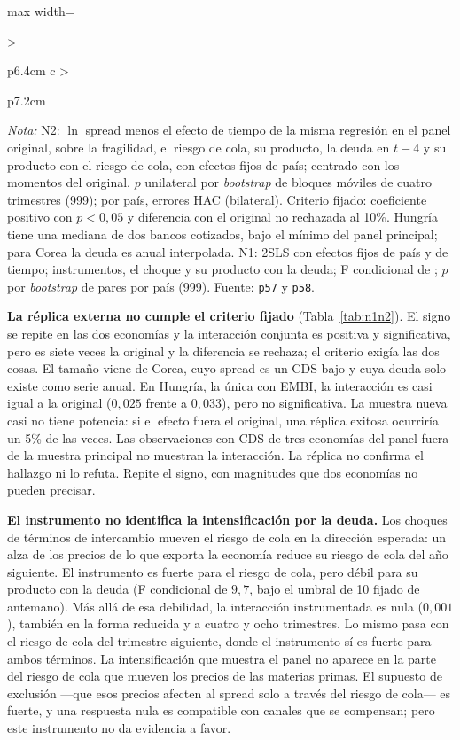 \begin{table}[htbp]
\begin{adjustbox}{max width=\linewidth}
\begin{tabular}{>{\raggedright\arraybackslash}p{6.4cm} c >{\raggedright\arraybackslash}p{7.2cm}}
\bottomrule
\end{tabular}
\end{adjustbox}
\par\smallskip\parbox{0.95\linewidth}{\footnotesize \textit{Nota:} N2: $\ln$ spread menos el efecto de tiempo de la misma regresión en el panel original, sobre la fragilidad, el riesgo de cola, su producto, la deuda en $t-4$ y su producto con el riesgo de cola, con efectos fijos de país; centrado con los momentos del original. $p$ unilateral por \textit{bootstrap} de bloques móviles de cuatro trimestres (999); por país, errores HAC (bilateral). Criterio fijado: coeficiente positivo con $p<0{,}05$ y diferencia con el original no rechazada al 10\%. Hungría tiene una mediana de dos bancos cotizados, bajo el mínimo del panel principal; para Corea la deuda es anual interpolada. N1: 2SLS con efectos fijos de país y de tiempo; instrumentos, el choque y su producto con la deuda; F condicional de \citet{SandersonWindmeijer2016}; $p$ por \textit{bootstrap} de pares por país (999). Fuente: \texttt{p57} y \texttt{p58}.}
\end{table}

\textbf{La réplica externa no cumple el criterio fijado} (Tabla~\ref{tab:n1n2}). El signo se repite en las dos economías y la interacción conjunta es positiva y significativa, pero es siete veces la original y la diferencia se rechaza; el criterio exigía las dos cosas. El tamaño viene de Corea, cuyo spread es un CDS bajo y cuya deuda solo existe como serie anual. En Hungría, la única con EMBI, la interacción es casi igual a la original ($0{,}025$ frente a $0{,}033$), pero no significativa. La muestra nueva casi no tiene potencia: si el efecto fuera el original, una réplica exitosa ocurriría un 5\% de las veces. Las observaciones con CDS de tres economías del panel fuera de la muestra principal no muestran la interacción. La réplica no confirma el hallazgo ni lo refuta. Repite el signo, con magnitudes que dos economías no pueden precisar.

\textbf{El instrumento no identifica la intensificación por la deuda.} Los choques de términos de intercambio mueven el riesgo de cola en la dirección esperada: un alza de los precios de lo que exporta la economía reduce su riesgo de cola del año siguiente. El instrumento es fuerte para el riesgo de cola, pero débil para su producto con la deuda (F condicional de $9{,}7$, bajo el umbral de 10 fijado de antemano). Más allá de esa debilidad, la interacción instrumentada es nula ($0{,}001$), también en la forma reducida y a cuatro y ocho trimestres. Lo mismo pasa con el riesgo de cola del trimestre siguiente, donde el instrumento sí es fuerte para ambos términos. La intensificación que muestra el panel no aparece en la parte del riesgo de cola que mueven los precios de las materias primas. El supuesto de exclusión ---que esos precios afecten al spread solo a través del riesgo de cola--- es fuerte, y una respuesta nula es compatible con canales que se compensan; pero este instrumento no da evidencia a favor.

